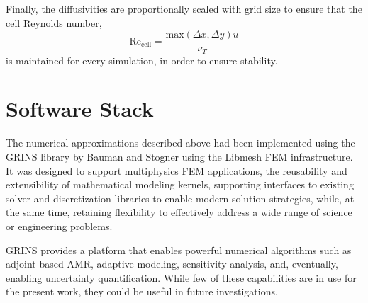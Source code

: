 Finally, the diffusivities are proportionally
scaled with grid size to ensure that the cell Reynolds number, 
\begin{equation}
 \text{Re}_\text{cell} = \frac{\text{max}(\Delta x,\Delta y) u}{\nu_T}
\end{equation}
 is maintained for every simulation, in order to ensure stability.




\section{Software Stack}

The numerical approximations described above had been implemented using
the GRINS library\cite{GRINSpaper} by Bauman and Stogner using the
Libmesh\cite{libMeshPaper} FEM infrastructure. It was designed to
support multiphysics FEM applications, the reusability and extensibility
of mathematical modeling kernels, supporting interfaces to existing
solver and discretization libraries to enable modern solution
strategies, while, at the same time, retaining flexibility to
effectively address a wide range of science or engineering problems.  

GRINS provides a platform that enables powerful numerical algorithms
such as adjoint-based AMR, adaptive modeling, sensitivity analysis,
and, eventually, enabling uncertainty quantification. While few of these
capabilities are in use for the present work, they could be useful in
future investigations. 

